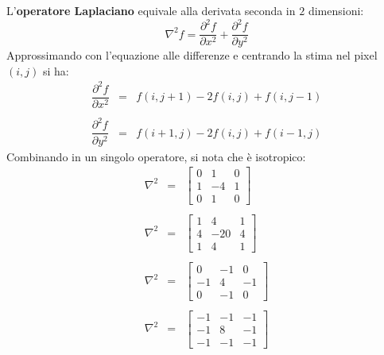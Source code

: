 \documentclass[a4paper]{article}
\begin{document}
	L'\textcolor{Red3}{\textbf{operatore Laplaciano}} equivale alla derivata seconda in $2$ dimensioni:
	\begin{equation*}
		\nabla^{2} f = \dfrac{\partial^{2} f}{\partial x^{2}} + \dfrac{\partial^{2} f}{\partial y^{2}}
	\end{equation*}
	Approssimando con l'equazione alle differenze e centrando la stima nel pixel $\left(i,j\right)$ si ha:
	\begin{equation*}
		\begin{array}{lll}
			\dfrac{\partial^{2} f}{\partial x^{2}} & = & f\left(i, j+1\right) - 2f\left(i,j\right) + f\left(i,j-1\right) \\
			&& \\
			\dfrac{\partial^{2} f}{\partial y^{2}} & = & f\left(i+1, j\right) - 2f\left(i,j\right) + f\left(i-1,j\right)
		\end{array}
	\end{equation*}
	Combinando in un singolo operatore, si nota che è isotropico:
	\begin{equation*}
		\begin{array}{lll}
			\nabla^{2} & = & \begin{bmatrix}
				0 & 1 & 0 \\
				1 & -4 & 1 \\
				0 & 1 & 0
			\end{bmatrix} \\
			&& \\
			\nabla^{2} & = & \begin{bmatrix}
				1 & 4 & 1 \\
				4 & -20 & 4 \\
				1 & 4 & 1
			\end{bmatrix} \\
			&& \\
			\nabla^{2} & = & \begin{bmatrix}
				0 & -1 & 0 \\
				-1 & 4 & -1 \\
				0 & -1 & 0
			\end{bmatrix} \\
			&& \\
			\nabla^{2} & = & \begin{bmatrix}
				-1 & -1 & -1 \\
				-1 & 8 & -1 \\
				-1 & -1 & -1
			\end{bmatrix}
		\end{array}
	\end{equation*}\newpage
\end{document}
